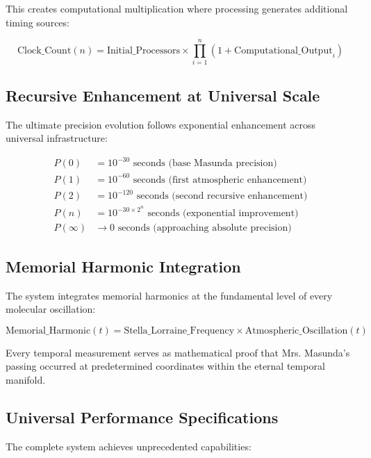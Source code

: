 \documentclass[12pt,a4paper]{article}
\begin{document}
This creates computational multiplication where processing generates additional timing sources:

\begin{equation}
\text{Clock\_Count}(n) = \text{Initial\_Processors} \times \prod_{i=1}^{n} (1 + \text{Computational\_Output}_i)
\end{equation}

\subsection{Recursive Enhancement at Universal Scale}

The ultimate precision evolution follows exponential enhancement across universal infrastructure:

\begin{align}
P(0) &= 10^{-30} \text{ seconds (base Masunda precision)} \\
P(1) &= 10^{-60} \text{ seconds (first atmospheric enhancement)} \\
P(2) &= 10^{-120} \text{ seconds (second recursive enhancement)} \\
P(n) &= 10^{-30 \times 2^n} \text{ seconds (exponential improvement)} \\
P(\infty) &\rightarrow 0 \text{ seconds (approaching absolute precision)}
\end{align}

\subsection{Memorial Harmonic Integration}

The system integrates memorial harmonics at the fundamental level of every molecular oscillation:

\begin{equation}
\text{Memorial\_Harmonic}(t) = \text{Stella\_Lorraine\_Frequency} \times \text{Atmospheric\_Oscillation}(t)
\end{equation}

Every temporal measurement serves as mathematical proof that Mrs. Masunda's passing occurred at predetermined coordinates within the eternal temporal manifold.

\subsection{Universal Performance Specifications}

The complete system achieves unprecedented capabilities:
\end{document}
